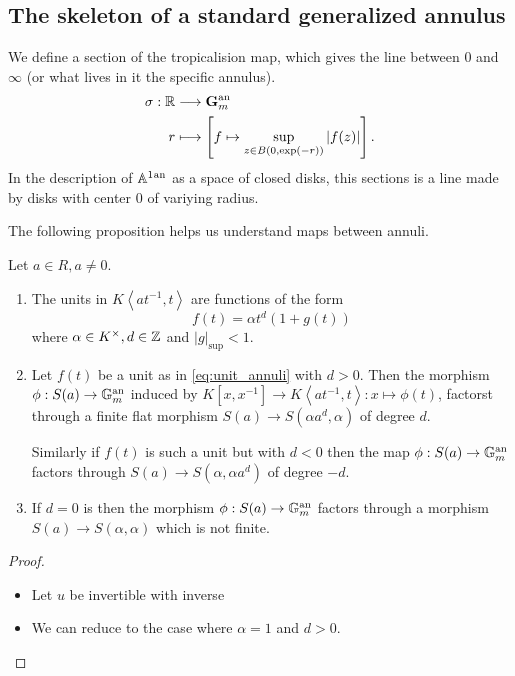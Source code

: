 \subsection{The skeleton of a standard generalized annulus} \label{sec:the_skeleton_of_a_standard_generalized_annulus}
We define a section of the tropicalision map, which gives the line between $0$ and $\infty$ (or what lives in it the specific annulus). 
\begin{align*}
	\sigma: \mathbb{R} &\longrightarrow \mathbf G_m^{\mathrm{an}} \\
	r &\longmapsto \left[f \mapsto \sup_{z \in B(0,\exp(-r))} |f(z)|\right]
.\end{align*}
In the description of $\mathbb{A}^{1}{}^{\text{an}}$ as a space of closed disks, this sections is a line made by disks with center $0$ of variying radius.


The following proposition helps us understand maps between annuli. 
\begin{proposition}
	[2.2 in paper]
	Let $a \in R, a \ne 0$.
	\begin{enumerate}
		\item 
			The units in $K \left<a t^{-1}, t \right>$ are functions of the form 
			\begin{equation}\label{eq:unit_annuli}
				f(t) = \alpha t ^{d}(1 + g(t))
			\end{equation}
			where $\alpha \in K^{\times }, d \in \mathbb{Z}$ and $|g|_\text{sup}  < 1$.
		\item Let $f(t)$ be a unit as in \eqref{eq:unit_annuli} with  $d > 0$.
			Then the morphism $\phi:S(a) \to \mathbb{G} _m ^{\mathrm{an}}$ induced by $K[x, x^{-1}] \to K\left<a t^{-1}, t \right> : x \mapsto \phi(t)$, factorst through a finite flat morphism $S(a) \to S(\alpha a^{d}, \alpha)$ of degree $d$. 

			Similarly if $f(t)$ is such a unit but with $d <0$ then the map $\phi: S(a) \to \mathbb{G} _m ^{\mathrm{an}}$ factors through $S(a) \to S(\alpha, \alpha a^{d})$ of degree $-d$. 

		\item If $d = 0$ is then the morphism $\phi: S(a) \to \mathbb{G} _m ^{\mathrm{an}}$ factors through a morphism $S(a) \to S(\alpha, \alpha)$ which is not finite. 
	\end{enumerate}

\end{proposition}
\begin{proof}
	\begin{itemize}
		\item {}
			Let $u$ be invertible with inverse 
		\item We can reduce to the case where $\alpha = 1$ and $d > 0$. 

	\end{itemize}
\end{proof}

